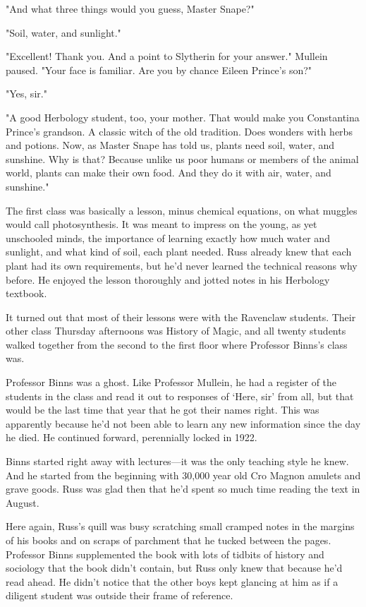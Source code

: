 "And what three things would you guess, Master Snape?"

"Soil, water, and sunlight."

"Excellent! Thank you. And a point to Slytherin for your answer." Mullein paused. "Your face is familiar. Are you by chance Eileen Prince's son?"

"Yes, sir."

"A good Herbology student, too, your mother. That would make you Constantina Prince's grandson. A classic witch of the old tradition. Does wonders with herbs and potions. Now, as Master Snape has told us, plants need soil, water, and sunshine. Why is that? Because unlike us poor humans or members of the animal world, plants can make their own food. And they do it with air, water, and sunshine."

The first class was basically a lesson, minus chemical equations, on what muggles would call photosynthesis. It was meant to impress on the young, as yet unschooled minds, the importance of learning exactly how much water and sunlight, and what kind of soil, each plant needed. Russ already knew that each plant had its own requirements, but he'd never learned the technical reasons why before. He enjoyed the lesson thoroughly and jotted notes in his Herbology textbook.

It turned out that most of their lessons were with the Ravenclaw students. Their other class Thursday afternoons was History of Magic, and all twenty students walked together from the second to the first floor where Professor Binns's class was.

Professor Binns was a ghost. Like Professor Mullein, he had a register of the students in the class and read it out to responses of `Here, sir' from all, but that would be the last time that year that he got their names right. This was apparently because he'd not been able to learn any new information since the day he died. He continued forward, perennially locked in 1922.

Binns started right away with lectures—it was the only teaching style he knew. And he started from the beginning with 30,000 year old Cro Magnon amulets and grave goods. Russ was glad then that he'd spent so much time reading the text in August.

Here again, Russ's quill was busy scratching small cramped notes in the margins of his books and on scraps of parchment that he tucked between the pages. Professor Binns supplemented the book with lots of tidbits of history and sociology that the book didn't contain, but Russ only knew that because he'd read ahead. He didn't notice that the other boys kept glancing at him as if a diligent student was outside their frame of reference.

